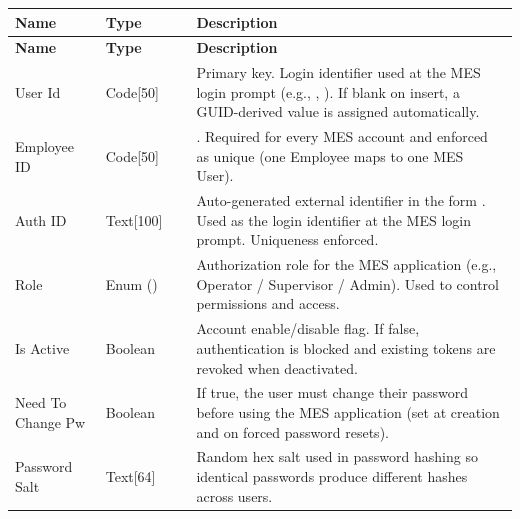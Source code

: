 \begin{longtable}{@{} P{0.18\linewidth} P{0.18\linewidth} P{0.64\linewidth} @{}}
	
	\toprule
	\textbf{Name}     & \textbf{Type}                 & \textbf{Description} \\
	\midrule
	\endfirsthead
	
	\toprule
	\textbf{Name}     & \textbf{Type}                 & \textbf{Description} \\
	\midrule
	\endhead
	
	
	
	\endlastfoot
	
	User Id           & Code[50]                      &                      
	Primary key. Login identifier used at the MES login prompt (e.g., , ). If blank on insert, a GUID-derived value is assigned automatically. \\
	\midrule
	
	Employee ID       & Code[50]                      &                      
	. Required for every MES account and enforced as unique (one Employee maps to one MES User). \\
	\midrule
	
	Auth ID           & Text[100]                     &                      
	Auto-generated external identifier in the form . Used as the login identifier at the MES login prompt. Uniqueness enforced. \\
	\midrule
	
	Role              & Enum () &                      
	Authorization role for the MES application (e.g., Operator / Supervisor / Admin). Used to control permissions and access. \\
	\midrule
	
		
	Is Active         & Boolean                       &                      
	Account enable/disable flag. If false, authentication is blocked and existing tokens are revoked when deactivated. \\
	\midrule
	
	Need To Change Pw & Boolean                       &                      
	If true, the user must change their password before using the MES application (set at creation and on forced password resets). \\
	\midrule
	
	Password Salt     & Text[64]                      &                      
	Random hex salt used in password hashing so identical passwords produce different hashes across users. \\
	\midrule
	

\end{longtable}
